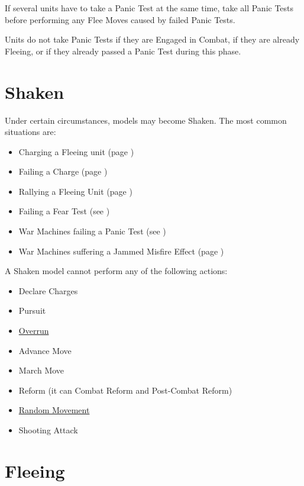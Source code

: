 If several units have to take a Panic Test at the same time, take all Panic Tests before performing any Flee Moves caused by failed Panic Tests.

Units do not take Panic Tests if they are Engaged in Combat, if they are already Fleeing, or if they already passed a Panic Test during this phase.

\section{Shaken}
\label{shaken}

Under certain circumstances, models may become Shaken. The most common situations are:

\begin{itemize}
\item Charging a Fleeing unit (page \pageref{charging_a_fleeing_unit})
\item Failing a Charge (page \pageref{failed_charge})
\item Rallying a Fleeing Unit (page \pageref{rally_fleeing_units})
\item Failing a Fear Test (see )
\item War Machines failing a Panic Test (see )
\item War Machines suffering a Jammed Misfire Effect (page \pageref{table/misfire})
\end{itemize}

\vspace*{5pt}

A Shaken model cannot perform any of the following actions:

\begin{itemize}
\item Declare Charges
\item Pursuit
\item \hyperref[overrun]{Overrun}
\item Advance Move
\item March Move
\item Reform (it can Combat Reform and Post-Combat Reform)
\item \hyperref[random_movement]{Random Movement}
\item Shooting Attack
\end{itemize}

\section{Fleeing}
\label{fleeing}

